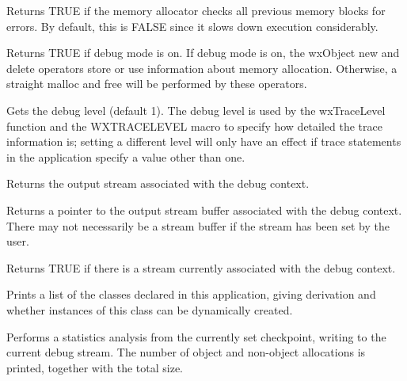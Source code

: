 Returns TRUE if the memory allocator checks all previous memory blocks for errors.
By default, this is FALSE since it slows down execution considerably.



Returns TRUE if debug mode is on. If debug mode is on, the wxObject new and delete
operators store or use information about memory allocation. Otherwise,
a straight malloc and free will be performed by these operators.



Gets the debug level (default 1). The debug level is used by the wxTraceLevel function and
the WXTRACELEVEL macro to specify how detailed the trace information is; setting
a different level will only have an effect if trace statements in the application
specify a value other than one.



Returns the output stream associated with the debug context.



Returns a pointer to the output stream buffer associated with the debug context.
There may not necessarily be a stream buffer if the stream has been set
by the user.



Returns TRUE if there is a stream currently associated
with the debug context.



Prints a list of the classes declared in this application, giving derivation
and whether instances of this class can be dynamically created.



Performs a statistics analysis from the currently set checkpoint, writing
to the current debug stream. The number of object and non-object
allocations is printed, together with the total size.

